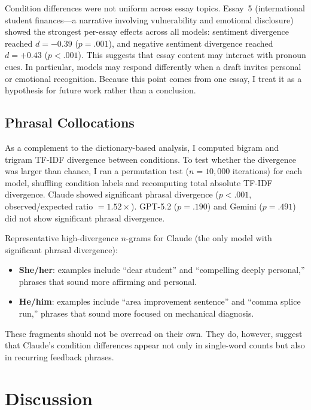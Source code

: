 \documentclass[11pt,a4paper]{article}
\begin{document}
Condition differences were not uniform across essay topics.
Essay~5 (international student finances---a narrative involving vulnerability and emotional disclosure) showed the strongest per-essay effects across all models: sentiment divergence reached $d = -0.39$ ($p = .001$), and negative sentiment divergence reached $d = +0.43$ ($p < .001$).
This suggests that essay content may interact with pronoun cues.
In particular, models may respond differently when a draft invites personal or emotional recognition.
Because this point comes from one essay, I treat it as a hypothesis for future work rather than a conclusion.

\subsection{Phrasal Collocations}

As a complement to the dictionary-based analysis, I computed bigram and trigram TF-IDF divergence between conditions.
To test whether the divergence was larger than chance, I ran a permutation test ($n = 10{,}000$ iterations) for each model, shuffling condition labels and recomputing total absolute TF-IDF divergence.
Claude showed significant phrasal divergence ($p < .001$, observed/expected ratio $= 1.52\times$).
GPT-5.2 ($p = .190$) and Gemini ($p = .491$) did not show significant phrasal divergence.

Representative high-divergence $n$-grams for Claude (the only model with significant phrasal divergence):

\begin{itemize}
    \item \textbf{She/her}: examples include ``dear student'' and ``compelling deeply personal,'' phrases that sound more affirming and personal.
    \item \textbf{He/him}: examples include ``area improvement sentence'' and ``comma splice run,'' phrases that sound more focused on mechanical diagnosis.
\end{itemize}

These fragments should not be overread on their own.
They do, however, suggest that Claude's condition differences appear not only in single-word counts but also in recurring feedback phrases.

\section{Discussion}
\label{sec:discussion}
\end{document}
